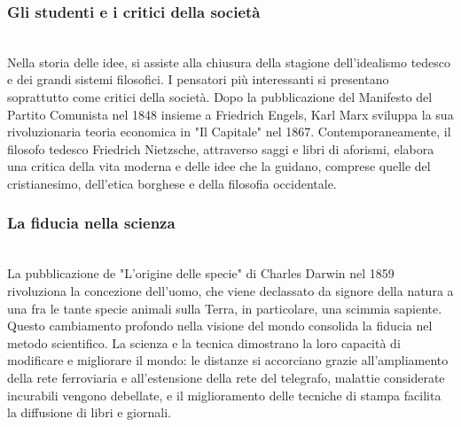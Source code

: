 \documentclass{report}
\begin{document}
\subsubsection{Gli  studenti  e  i  critici  della  società}
\\
Nella storia delle idee, si assiste alla chiusura della stagione dell'idealismo tedesco e dei grandi sistemi filosofici. I pensatori più interessanti si presentano soprattutto come critici della società. Dopo la pubblicazione del Manifesto del Partito Comunista nel 1848 insieme a Friedrich Engels, Karl Marx sviluppa la sua rivoluzionaria teoria economica in "Il Capitale" nel 1867. Contemporaneamente, il filosofo tedesco Friedrich Nietzsche, attraverso saggi e libri di aforismi, elabora una critica della vita moderna e delle idee che la guidano, comprese quelle del cristianesimo, dell'etica borghese e della filosofia occidentale.
\\
\subsubsection{La  fiducia  nella  scienza}
\\
La pubblicazione de "L'origine delle specie" di Charles Darwin nel 1859 rivoluziona la concezione dell'uomo, che viene declassato da signore della natura a una fra le tante specie animali sulla Terra, in particolare, una scimmia sapiente. Questo cambiamento profondo nella visione del mondo consolida la fiducia nel metodo scientifico. La scienza e la tecnica dimostrano la loro capacità di modificare e migliorare il mondo: le distanze si accorciano grazie all'ampliamento della rete ferroviaria e all'estensione della rete del telegrafo, malattie considerate incurabili vengono debellate, e il miglioramento delle tecniche di stampa facilita la diffusione di libri e giornali.
\\
\end{document}
